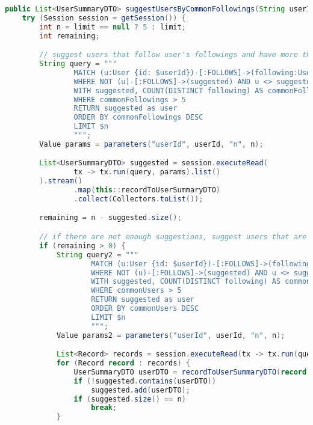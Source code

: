 \begin{mdframed}[style=customstyle]
\begin{lstlisting}[language=java]
public List<UserSummaryDTO> suggestUsersByCommonFollowings(String userId, Integer limit) throws DAOException {
    try (Session session = getSession()) {
        int n = limit == null ? 5 : limit;
        int remaining;

        // suggest users that follow user's followings and have more than 5 common followings
        String query = """
                MATCH (u:User {id: $userId})-[:FOLLOWS]->(following:User)<-[:FOLLOWS]-(suggested:User)
                WHERE NOT (u)-[:FOLLOWS]->(suggested) AND u <> suggested
                WITH suggested, COUNT(DISTINCT following) AS commonFollowings
                WHERE commonFollowings > 5
                RETURN suggested as user
                ORDER BY commonFollowings DESC
                LIMIT $n
                """;
        Value params = parameters("userId", userId, "n", n);

        List<UserSummaryDTO> suggested = session.executeRead(
                tx -> tx.run(query, params).list()
        ).stream()
                .map(this::recordToUserSummaryDTO)
                .collect(Collectors.toList());

        remaining = n - suggested.size();

        // if there are not enough suggestions, suggest users that are followed by the user's followings and have more than 5 connections
        if (remaining > 0) {
            String query2 = """
                    MATCH (u:User {id: $userId})-[:FOLLOWS]->(following:User)-[:FOLLOWS]->(suggested:User)
                    WHERE NOT (u)-[:FOLLOWS]->(suggested) AND u <> suggested
                    WITH suggested, COUNT(DISTINCT following) AS commonUsers
                    WHERE commonUsers > 5
                    RETURN suggested as user
                    ORDER BY commonUsers DESC
                    LIMIT $n
                    """;
            Value params2 = parameters("userId", userId, "n", n);

            List<Record> records = session.executeRead(tx -> tx.run(query2, params2).list());
            for (Record record : records) {
                UserSummaryDTO userDTO = recordToUserSummaryDTO(record);
                if (!suggested.contains(userDTO))
                    suggested.add(userDTO);
                if (suggested.size() == n)
                    break;
            }


\end{lstlisting}
\end{mdframed}
